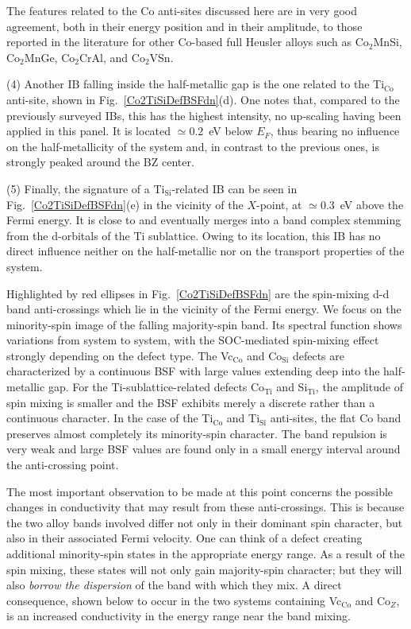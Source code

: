 \documentclass[aps,prb,twocolumn,superscriptaddress,showpacs]{revtex4}
\newcommand{\FG}[1]{Fig.~\ref{#1}}
\begin{document}
The features related to the Co anti-sites 
discussed here are in very good agreement, 
both in their energy position and in 
their amplitude, to those reported in the
literature for other Co-based full Heusler alloys such as
Co$_2$MnSi,\cite{PCF04,HSK09b} Co$_2$MnGe,\cite{PCF04}
Co$_2$CrAl,\cite{AH13} and Co$_2$VSn.\cite{MKHM13}


(4) Another IB falling inside the half-metallic gap
is the one related to the Ti$_\text{Co}$ anti-site, 
shown in \FG{Co2TiSiDefBSFdn}(d). 
One notes that, compared to the previously surveyed IBs,
this has the highest intensity, no up-scaling 
having been applied in this panel. 
It is located $\simeq 0.2$~eV below $E_F$,
thus bearing no influence on the half-metallicity of
the system and, in contrast to the previous ones,
is strongly peaked around the BZ center.

(5) Finally, the signature of a Ti$_\text{Si}$-related IB
can be seen in \FG{Co2TiSiDefBSFdn}(e) 
in the vicinity of the $X$-point, at $\simeq 0.3$~eV
above the Fermi energy. It is close to
and eventually merges into a band complex 
stemming from the d-orbitals of the Ti
sublattice. Owing to its location, this IB has no direct
influence neither on the half-metallic nor on the transport 
properties of the system. 


 

Highlighted by red ellipses in \FG{Co2TiSiDefBSFdn}
are the spin-mixing d-d band anti-crossings which
lie in the vicinity of the Fermi energy. We focus
on the minority-spin image of the falling 
majority-spin band. Its spectral function shows
variations from system to system, with the 
SOC-mediated spin-mixing effect 
strongly depending on the defect type. 
The Vc$_\text{Co}$ and Co$_\text{Si}$ defects
are characterized by a continuous BSF with 
large values extending deep into the half-metallic
gap. For the Ti-sublattice-related
defects Co$_\text{Ti}$ and Si$_\text{Ti}$,
the amplitude of spin mixing is smaller and
the BSF exhibits merely a discrete rather
than a continuous character. 
In the case of the Ti$_\text{Co}$ and Ti$_\text{Si}$ anti-sites,
the flat Co band preserves almost completely
its minority-spin character. The band repulsion is 
very weak and large BSF values are found only
in a small energy interval around the anti-crossing point.

The most important observation to be made at this point
concerns the possible changes in conductivity that may 
result from these anti-crossings. This is because
the two alloy bands involved differ not only in
their dominant spin character, but also in their
associated Fermi velocity. One can
think of a defect creating additional 
minority-spin states in the appropriate energy range. 
As a result of the spin mixing, these states will not only 
gain majority-spin character; but they will also
{\em borrow the dispersion} of the band with which they mix.
A direct consequence, shown below to occur in
the two systems containing Vc$_\text{Co}$ and 
Co$_Z$, is an increased conductivity in the
energy range near the band mixing.
\end{document}
